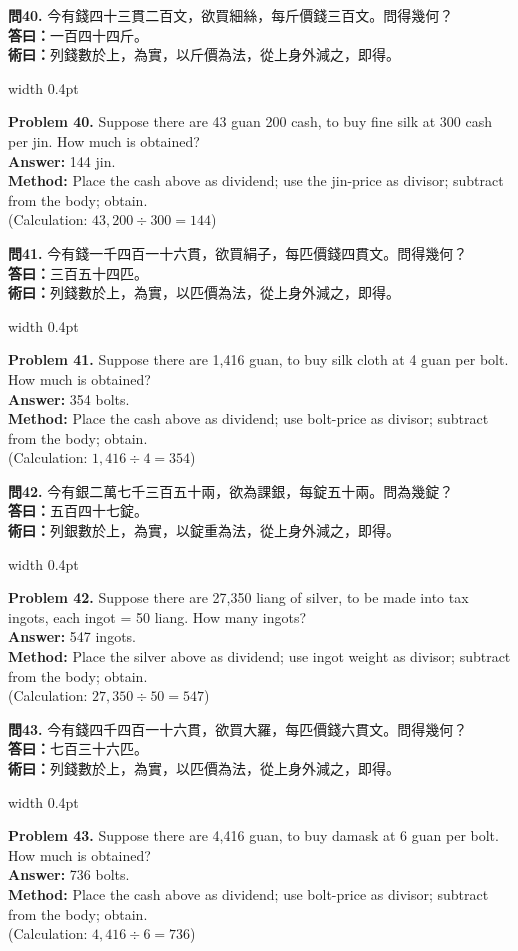 \documentclass[10pt,a4paper]{article}
\newlength{\cnwidth}
\newlength{\enwidth}
\newcommand{\bilingual}[2]{%
  \noindent%
  \begin{minipage}[t]{\cnwidth}%
    #1%
  \end{minipage}%
  \hfill\vrule width 0.4pt\hfill%
  \begin{minipage}[t]{\enwidth}%
    #2%
  \end{minipage}%
  \par\smallskip%
}
\begin{document}
\bilingual{%
  \textbf{問40.}
  今有錢四十三貫二百文，欲買細絲，每斤價錢三百文。問得幾何？\\
  \textbf{答曰：}一百四十四斤。\\
  \textbf{術曰：}列錢數於上，為實，以斤價為法，從上身外減之，即得。
}{%
  \textbf{Problem 40.}
  Suppose there are 43 guan 200 cash, to buy fine silk at 300 cash per jin.
  How much is obtained?\\
  \textbf{Answer:} 144 jin.\\
  \textbf{Method:} Place the cash above as dividend; use the jin-price as divisor;
  subtract from the body; obtain.\\
  (Calculation: $43{,}200 \div 300 = 144$)
}

\bilingual{%
  \textbf{問41.}
  今有錢一千四百一十六貫，欲買絹子，每匹價錢四貫文。問得幾何？\\
  \textbf{答曰：}三百五十四匹。\\
  \textbf{術曰：}列錢數於上，為實，以匹價為法，從上身外減之，即得。
}{%
  \textbf{Problem 41.}
  Suppose there are 1,416 guan, to buy silk cloth at 4 guan per bolt.
  How much is obtained?\\
  \textbf{Answer:} 354 bolts.\\
  \textbf{Method:} Place the cash above as dividend; use bolt-price as divisor;
  subtract from the body; obtain.\\
  (Calculation: $1{,}416 \div 4 = 354$)
}

\bilingual{%
  \textbf{問42.}
  今有銀二萬七千三百五十兩，欲為課銀，每錠五十兩。問為幾錠？\\
  \textbf{答曰：}五百四十七錠。\\
  \textbf{術曰：}列銀數於上，為實，以錠重為法，從上身外減之，即得。
}{%
  \textbf{Problem 42.}
  Suppose there are 27,350 liang of silver, to be made into tax ingots,
  each ingot = 50 liang. How many ingots?\\
  \textbf{Answer:} 547 ingots.\\
  \textbf{Method:} Place the silver above as dividend; use ingot weight as divisor;
  subtract from the body; obtain.\\
  (Calculation: $27{,}350 \div 50 = 547$)
}

\bilingual{%
  \textbf{問43.}
  今有錢四千四百一十六貫，欲買大羅，每匹價錢六貫文。問得幾何？\\
  \textbf{答曰：}七百三十六匹。\\
  \textbf{術曰：}列錢數於上，為實，以匹價為法，從上身外減之，即得。
}{%
  \textbf{Problem 43.}
  Suppose there are 4,416 guan, to buy damask at 6 guan per bolt.
  How much is obtained?\\
  \textbf{Answer:} 736 bolts.\\
  \textbf{Method:} Place the cash above as dividend; use bolt-price as divisor;
  subtract from the body; obtain.\\
  (Calculation: $4{,}416 \div 6 = 736$)
}
\end{document}
